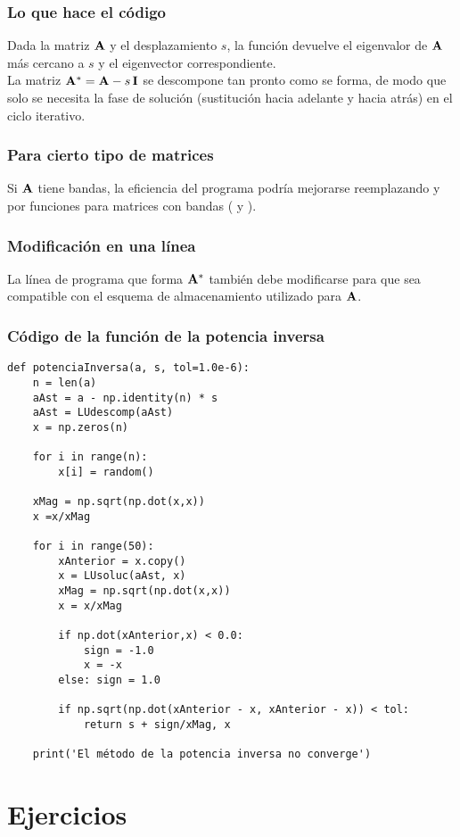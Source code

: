 \documentclass[12pt]{beamer}
\begin{document}
\begin{frame}
\frametitle{Lo que hace el código}
Dada la matriz $\vb{A}$ y el desplazamiento $s$, la función  devuelve el eigenvalor de $\vb{A}$ más cercano a $s$ y el eigenvector correspondiente.
\\
\bigskip
\pause
La matriz $\vb{A}^{*} = \vb{A} - s \, \vb{I}$ se descompone tan pronto como se forma, de modo que solo se necesita la fase de solución (sustitución hacia adelante y hacia atrás) en el ciclo iterativo.
\end{frame}
\begin{frame}
\frametitle{Para cierto tipo de matrices}
Si $\vb{A}$ tiene bandas, la eficiencia del programa podría mejorarse reemplazando  y  por funciones para matrices con bandas ( y ).
\end{frame}
\begin{frame}
\frametitle{Modificación en una línea}
La línea de programa que forma $\vb{A}^{*}$ también debe modificarse para que sea compatible con el esquema de almacenamiento utilizado para $\vb{A}$.
\end{frame}
\begin{frame}
\frametitle{Código de la función de la potencia inversa}
\begin{lstlisting}[caption=Código completo para la potencia inversa]
def potenciaInversa(a, s, tol=1.0e-6):
    n = len(a)
    aAst = a - np.identity(n) * s
    aAst = LUdescomp(aAst)
    x = np.zeros(n)
    
    for i in range(n):
        x[i] = random()
        
    xMag = np.sqrt(np.dot(x,x))
    x =x/xMag
    
    for i in range(50):
        xAnterior = x.copy()
        x = LUsoluc(aAst, x)
        xMag = np.sqrt(np.dot(x,x))
        x = x/xMag
        
        if np.dot(xAnterior,x) < 0.0:
            sign = -1.0
            x = -x
        else: sign = 1.0
        
        if np.sqrt(np.dot(xAnterior - x, xAnterior - x)) < tol:
            return s + sign/xMag, x
    
    print('El método de la potencia inversa no converge')  
\end{lstlisting}
\end{frame}

\section{Ejercicios}
\end{document}
